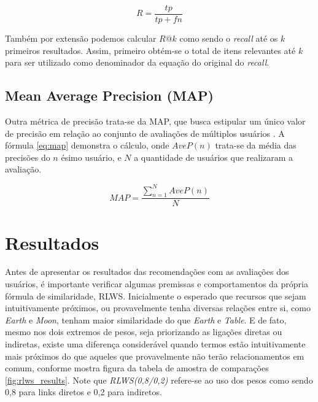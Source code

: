 \begin{equation}
	R = \frac{tp}{tp + fn}
\label{eq:recall}
\end{equation}

Também por extensão podemos calcular $R@k$ como sendo o \textit{recall} até os $k$ primeiros resultados. Assim, primeiro obtém-se o total de itens relevantes até $k$ para ser utilizado como denominador da equação do original do \textit{recall}.

\subsection{Mean Average Precision (MAP)}

Outra métrica de precisão trata-se da \ac{MAP}, que busca estipular um único valor de precisão em relação ao conjunto de avaliações de múltiplos usuários \citep{Manning:2008}. A fórmula \ref{eq:map} demonstra o cálculo, onde $AveP(n)$ trata-se da média das precisões do $n$ ésimo usuário, e $N$ a quantidade de usuários que realizaram a avaliação.

\begin{equation}
	MAP = \frac{\sum_{n=1}^{N}AveP(n)}{N}
\label{eq:map}
\end{equation}

\section{Resultados}

Antes de apresentar os resultados das recomendações com as avaliações dos usuários, é importante verificar algumas premissas e comportamentos da própria fórmula de similaridade, \ac{RLWS}. Inicialmente o esperado que recursos que sejam intuitivamente próximos, ou provavelmente tenha diversas relações entre si,  como \textit{Earth} e \textit{Moon}, tenham maior similaridade do que \textit{Earth} e \textit{Table}. E de fato, mesmo nos dois extremos de pesos, seja priorizando as ligações diretas ou indiretas, existe uma diferença considerável quando termos estão intuitivamente mais próximos do que aqueles que provavelmente não terão relacionamentos em comum, conforme mostra figura da tabela de amostra de comparações \ref{fig:rlws_results}. Note que \textit{RLWS(0,8/0,2)} refere-se ao uso dos pesos como sendo 0,8 para links diretos e 0,2 para indiretos.

